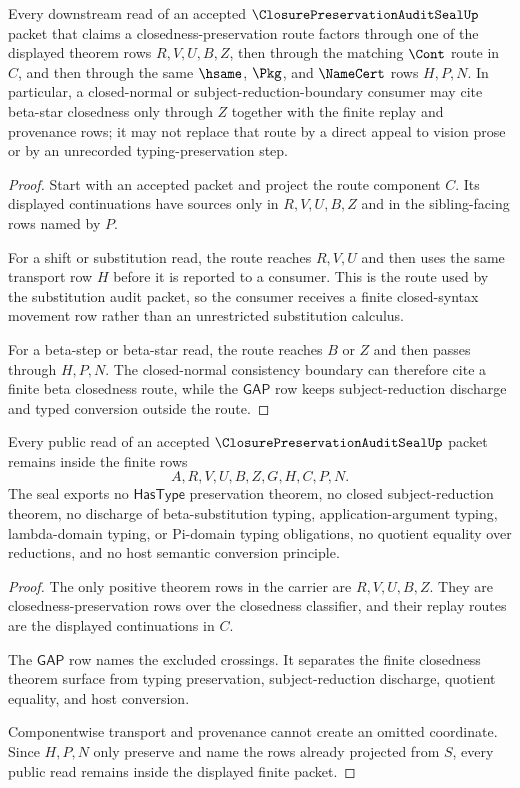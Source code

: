 \begin{theorem}
\label{thm:closure-preservation-audit-seal-route-exactness}
Every downstream read of an accepted $\ClosurePreservationAuditSealUp$ packet that claims a closedness-preservation route factors through one of the displayed theorem rows $R,V,U,B,Z$, then through the matching $\Cont$ route in $C$, and then through the same $\hsame$, $\Pkg$, and $\NameCert$ rows $H,P,N$. In particular, a closed-normal or subject-reduction-boundary consumer may cite beta-star closedness only through $Z$ together with the finite replay and provenance rows; it may not replace that route by a direct appeal to vision prose or by an unrecorded typing-preservation step.
\end{theorem}
\begin{proof}
Start with an accepted packet and project the route component $C$. Its displayed continuations have sources only in $R,V,U,B,Z$ and in the sibling-facing rows named by $P$.

For a shift or substitution read, the route reaches $R,V,U$ and then uses the same transport row $H$ before it is reported to a consumer. This is the route used by the substitution audit packet, so the consumer receives a finite closed-syntax movement row rather than an unrestricted substitution calculus.

For a beta-step or beta-star read, the route reaches $B$ or $Z$ and then passes through $H,P,N$. The closed-normal consistency boundary can therefore cite a finite beta closedness route, while the $\mathsf{GAP}$ row keeps subject-reduction discharge and typed conversion outside the route.
\end{proof}

\begin{theorem}
\label{thm:closure-preservation-audit-seal-nonescape}
Every public read of an accepted $\ClosurePreservationAuditSealUp$ packet remains inside the finite rows
$$
A,R,V,U,B,Z,G,H,C,P,N.
$$
The seal exports no $\mathsf{HasType}$ preservation theorem, no closed subject-reduction theorem, no discharge of beta-substitution typing, application-argument typing, lambda-domain typing, or Pi-domain typing obligations, no quotient equality over reductions, and no host semantic conversion principle.
\end{theorem}
\begin{proof}
The only positive theorem rows in the carrier are $R,V,U,B,Z$. They are closedness-preservation rows over the closedness classifier, and their replay routes are the displayed continuations in $C$.

The $\mathsf{GAP}$ row names the excluded crossings. It separates the finite closedness theorem surface from typing preservation, subject-reduction discharge, quotient equality, and host conversion.

Componentwise transport and provenance cannot create an omitted coordinate. Since $H,P,N$ only preserve and name the rows already projected from $S$, every public read remains inside the displayed finite packet.
\end{proof}

